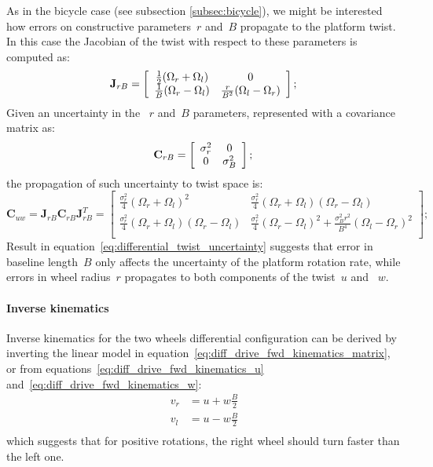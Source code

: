 As in the bicycle case (see subsection \ref{subsec:bicycle}), we might be interested how errors on constructive parameters~$r$ and~$B$ propagate to the platform twist. In this case the Jacobian of the twist with respect to these parameters is computed as: 
\begin{equation}
\mathbf{J}_{r B} = 
\left[
 \begin{array}{cc}
  \frac{1}{2}(\Omega_r+\Omega_l) & 0  \\
  \frac{1}{B}(\Omega_r-\Omega_l) & \frac{r}{B^2}(\Omega_l-\Omega_r)  \\
 \end{array}
 \right]; \\ 
\end{equation}
Given an uncertainty in the ~$r$ and~$B$ parameters, represented with a covariance matrix as:
\begin{equation}
\mathbf{C}_{r B} = 
\left[
 \begin{array}{cc}
  \sigma^2_r & 0  \\
  0 & \sigma^2_B  \\
 \end{array}
 \right]; \\ 
\end{equation}
the propagation of such uncertainty to twist space is: 
\begin{equation}
\mathbf{C}_{uw} = \mathbf{J}_{r B} \mathbf{C}_{r B} \mathbf{J}_{r B}^T = 
 \left[
 \begin{array}{cc}
 \frac{\sigma^2_r}{4}(\Omega_r+\Omega_l)^2 & \frac{\sigma^2_r}{4}(\Omega_r+\Omega_l)(\Omega_r-\Omega_l) \\
 \frac{\sigma^2_r}{4}(\Omega_r+\Omega_l)(\Omega_r-\Omega_l) & \frac{\sigma^2_r}{4}(\Omega_r-\Omega_l)^2 + \frac{\sigma^2_B r^2}{B^4}(\Omega_l-\Omega_r)^2 \\
 \end{array}
 \right];
 \label{eq:differential_twist_uncertainty}
\end{equation}
Result in equation~\ref{eq:differential_twist_uncertainty} suggests that error in baseline length~$B$ only affects the uncertainty of the platform rotation rate, while errors in wheel radius~$r$ propagates to both components of the twist~$u$ and ~$w$. 

\paragraph{Inverse kinematics}
Inverse kinematics for the two wheels differential configuration can be derived by inverting the linear model in equation~\ref{eq:diff_drive_fwd_kinematics_matrix}, or from equations~\ref{eq:diff_drive_fwd_kinematics_u} and~\ref{eq:diff_drive_fwd_kinematics_w}: 
\begin{align}
 v_r & = u + w\frac{B}{2} \\
 v_l & = u - w\frac{B}{2} \\
\end{align}
which suggests that for positive rotations, the right wheel should turn faster than the left one.

